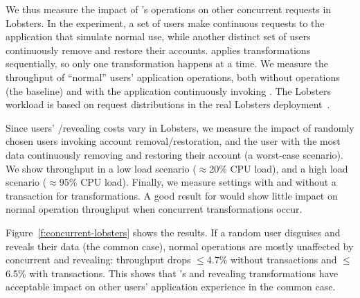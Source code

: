 %
We thus measure the impact of \sys's operations on other concurrent requests
in Lobsters.
%
In the experiment, a set of users make continuous requests to the
application that simulate normal use, while another distinct set of users
continuously remove and restore their accounts.
%
\sys applies \xxing transformations sequentially, so only one transformation
happens at a time.
%
%
We measure the throughput of ``normal'' users' application operations, both
without \sys operations (the baseline) and with the application continuously
invoking \sys.
%
The Lobsters workload is based on request distributions in the real
Lobsters deployment~\cite{lobsters-data}.
%

%
Since users' \xxing/revealing costs vary in Lobsters, we measure the
impact of \one{} randomly chosen users invoking account removal/restoration, and
\two{} the user with the most data continuously removing and restoring their
account (a worst-case scenario).
%
We show throughput in a low load scenario ($\approx$20\% CPU load),
and a high load scenario ($\approx$95\% CPU load).
%
Finally, we measure settings with and without a transaction for \sys
transformations.
%
%
A good result for \sys would show little impact on normal operation throughput
when concurrent \xxing transformations occur.
%

%
Figure~\ref{f:concurrent-lobsters} shows the results.
%
If a random user disguises and reveals their data (the common case),
normal operations are mostly unaffected by concurrent \xxing and revealing:
throughput drops $\le$4.7\% without transactions and $\le$6.5\% with transactions.
This shows that \sys's \xxing and revealing transformations have acceptable
impact on other users' application experience in the common case.

